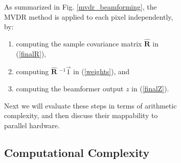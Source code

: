 \documentclass[12pt,journal,draftclsnofoot,onecolumn]{IEEEtran}
\newcommand\mat[1]{\boldsymbol{#1}}
\newcommand\1{\vec 1}
\newcommand*\eR{\mat{\hat R}}
\newcommand*\eRi{\hat{\mat R}\;\!^{-1}}
\begin{document}
\begin{figure}[H]
\begin{figure}[!t]
\begin{figure}[!t]
\end{figure}
As summarized in Fig. \ref{mvdr_beamforming}, the MVDR method is applied to each pixel independently, by:
\begin{enumerate}
\item computing the sample covariance matrix $\eR$ in (\ref{finalR}),
\item computing $\eRi\1$ in (\ref{weights}), and
\item computing the beamformer output $z$ in (\ref{finalZ}).
\end{enumerate}
Next we will evaluate these steps in terms of arithmetic complexity, and then discuss their mappability to parallel hardware.

\subsection{Computational Complexity}

 


\end{figure}
\end{figure}
\end{document}
